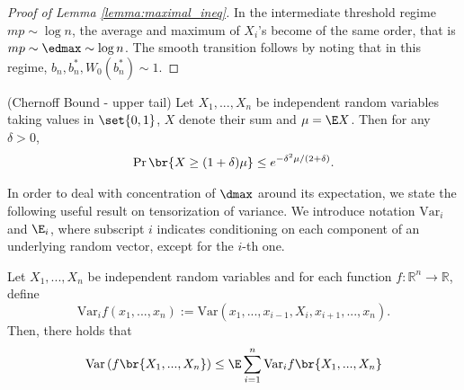 \begin{proof}[Proof of Lemma \ref{lemma:maximal_ineq}]
In the intermediate threshold regime \(mp \sim \log n\), the average and maximum of $X_i$'s become of the same order, that is $mp \sim \edmax \sim \log n$. The smooth transition follows by noting that in this regime, $b_n, b_n^*, W_0(b_n^*)\sim 1$.
\end{proof}
%
\begin{lemma}\label{lemma:chernoff}(Chernoff Bound - upper tail)
Let $X_1, ..., X_n$ be independent random variables taking values in $\set{0, 1}$, $X$ denote their sum and $\mu = \E X$. Then for any $\delta > 0$,
    \begin{align*}
        \Pr\br{X \geq (1+\delta)\mu}\leq e^{-\delta^2 \mu / (2+\delta)}.
    \end{align*}
\end{lemma}


\noindent
In order to deal with concentration of $\dmax$ around its expectation, we state the following useful result on tensorization of variance. We introduce notation \(\text{Var}_i\) and \(\E_i\), where subscript $i$ indicates conditioning on each component of an underlying random vector, except for the $i$-th one.
\begin{lemma}\label{lemma:tensorization_var}
Let $X_1,...,X_n$ be independent random variables and for each function $f:\mathbb{R}^n \rightarrow \mathbb{R}$, define 
\[\text{Var}_i f(x_1,...,x_n) := \text{Var}\left(x_1,...,x_{i-1},X_i,x_{i+1},...,x_n\right).\]
Then, there holds that 
\[\text{Var} \left(f\br{X_1,...,X_n}\right ) \leq \E \sum_{i = 1}^n \text{Var}_i f\br{X_1,...,X_n}\]
\end{lemma}



